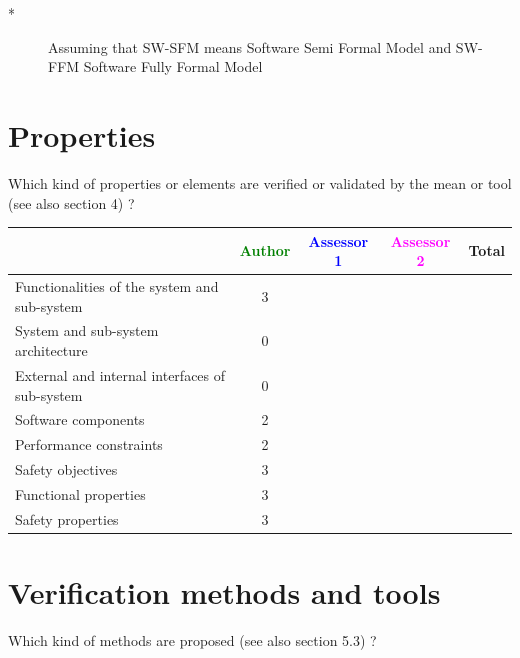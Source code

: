 \begin{author_comment}
\begin{description}
\item[*] Assuming that SW-SFM means Software Semi Formal Model and SW-FFM Software Fully Formal Model
\end{description}
\end{author_comment}

\section{Properties}

Which kind of properties or elements are verified or validated by the mean or tool (see also \citep{D4.1} section 4)  ?



\begin{tabular}{|l | c | c | c | c|}
\hline
& \textcolor{green}{Author} & \textcolor{blue}{Assessor 1} & \textcolor{magenta}{Assessor 2} & Total \\
\hline 
Functionalities of the system and sub-system & 3& & &  \\
\hline
System and sub-system architecture & 0& & &  \\
\hline
External and internal interfaces of sub-system & 0& & &  \\
\hline
Software components & 2& & &  \\
\hline
Performance constraints & 2& & &  \\
\hline
Safety objectives & 3& & &  \\
\hline
Functional properties & 3& & &  \\
\hline
Safety properties & 3& & &  \\
\hline
\end{tabular}



\section{Verification methods and tools}

Which kind of methods are proposed (see also \citep{D4.1} section 5.3) ?



